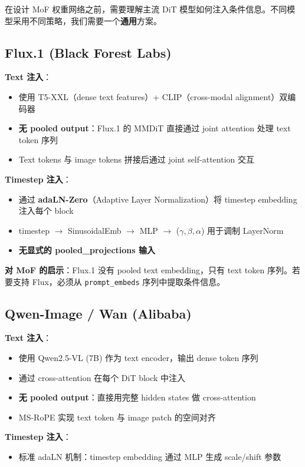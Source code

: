 \documentclass[11pt,a4paper]{article}
\theoremstyle{definition}
\begin{document}
在设计 MoF 权重网络之前，需要理解主流 DiT 模型如何注入条件信息。不同模型采用不同策略，我们需要一个\textbf{通用}方案。

\subsection{Flux.1 (Black Forest Labs)}

\textbf{Text 注入}：
\begin{itemize}
    \item 使用 T5-XXL（dense text features）+ CLIP（cross-modal alignment）双编码器
    \item \textbf{无 pooled output}：Flux.1 的 MMDiT 直接通过 joint attention 处理 text token 序列
    \item Text tokens 与 image tokens 拼接后通过 joint self-attention 交互
\end{itemize}

\textbf{Timestep 注入}：
\begin{itemize}
    \item 通过 \textbf{adaLN-Zero}（Adaptive Layer Normalization）将 timestep embedding 注入每个 block
    \item timestep $\to$ SinusoidalEmb $\to$ MLP $\to$ ($\gamma, \beta, \alpha$) 用于调制 LayerNorm
    \item \textbf{无显式的 pooled\_projections 输入}
\end{itemize}

\textbf{对 MoF 的启示}：Flux.1 没有 pooled text embedding，只有 text token 序列。若要支持 Flux，必须从 \texttt{prompt\_embeds} 序列中提取条件信息。

\subsection{Qwen-Image / Wan (Alibaba)}

\textbf{Text 注入}：
\begin{itemize}
    \item 使用 Qwen2.5-VL (7B) 作为 text encoder，输出 dense token 序列
    \item 通过 cross-attention 在每个 DiT block 中注入
    \item \textbf{无 pooled output}：直接用完整 hidden states 做 cross-attention
    \item MS-RoPE 实现 text token 与 image patch 的空间对齐
\end{itemize}

\textbf{Timestep 注入}：
\begin{itemize}
    \item 标准 adaLN 机制：timestep embedding 通过 MLP 生成 scale/shift 参数
\end{itemize}
\end{document}
